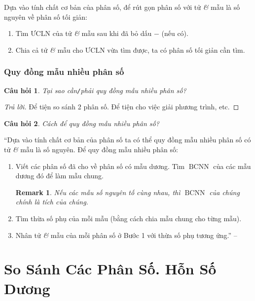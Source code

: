 \documentclass[oneside]{book}
\numberwithin{equation}{section}
\newtheorem{cauhoi}{Câu hỏi}[section]
\newtheorem{remark}{Remark}[section]
\begin{document}
Dựa vào tính chất cơ bản của phân số, để rút gọn phân số với tử \textit{\&} mẫu là số nguyên về phân số tối giản:
\begin{enumerate}
	\item Tìm $\mbox{ƯCLN}$ của tử \textit{\&} mẫu sau khi đã bỏ dấu $-$ (nếu có).
	\item Chia cả tử \textit{\&} mẫu cho $\mbox{ƯCLN}$ vừa tìm được, ta có phân số  tối giản cần tìm.
\end{enumerate}

\subsubsection{Quy đồng mẫu nhiều phân số}
\begin{cauhoi}
	Tại sao cần\emph{\texttt{/}}phải quy đồng mẫu nhiều phân số?
\end{cauhoi}

\begin{proof}[Trả lời]
	Để tiện so sánh 2 phân số. Để tiện cho việc giải phương trình, etc.
\end{proof}

\begin{cauhoi}
	Cách để quy đồng mẫu nhiều phân số?
\end{cauhoi}
``Dựa vào tính chất cơ bản của phân số ta có thể quy đồng mẫu nhiều phân số có tử \textit{\&} mẫu là số nguyên. Để quy đồng mẫu nhiều phân số:
\begin{enumerate}
	\item Viết các phân số đã cho về phân số có mẫu dương. Tìm $\operatorname{BCNN}$ của các mẫu dương đó để làm mẫu chung.
	\begin{remark}
		Nếu các mẫu số nguyên tố cùng nhau, thì $\operatorname{BCNN}$ của chúng chính là tích của chúng.
	\end{remark}
	\item Tìm thừa số phụ của mỗi mẫu (bằng cách chia mẫu chung cho từng mẫu).
	\item Nhân tử \textit{\&} mẫu của mỗi phân số ở Bước 1 với thừa số phụ tương ứng.'' -- \cite[p. 29]{Thai_Anh_Dat_Ha_Loan_Nam_Quang_Toan_6_tap_2}
\end{enumerate}


\section{So Sánh Các Phân Số. Hỗn Số Dương}
\end{document}
